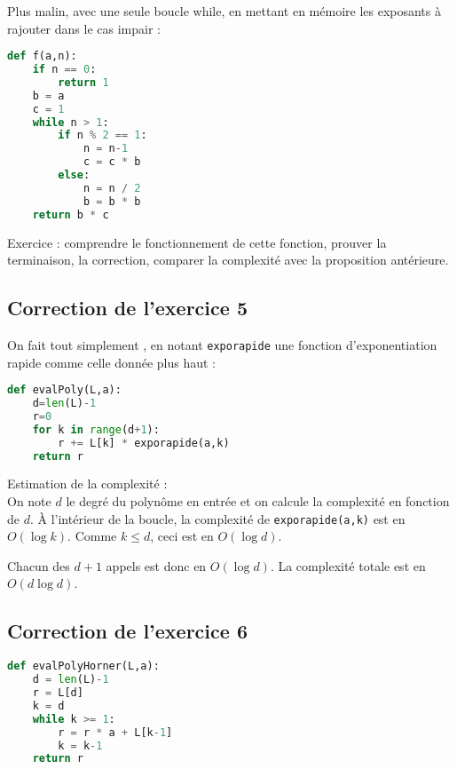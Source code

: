 \documentclass[11pt,a4paper]{article}
\begin{document}
Plus malin, avec une seule boucle while, en mettant en mémoire les exposants à rajouter dans le cas impair : 
\begin{lstlisting}[language=Python]
def f(a,n):
	if n == 0:
		return 1
	b = a
	c = 1
	while n > 1:
		if n % 2 == 1:
			n = n-1
			c = c * b
		else:
			n = n / 2
			b = b * b
	return b * c
\end{lstlisting}

Exercice : comprendre le fonctionnement de cette fonction, prouver la terminaison, la correction, comparer la complexité avec la proposition antérieure.



\subsection*{Correction de l'exercice 5}

On fait tout simplement , en notant \verb+exporapide+ une fonction d'exponentiation rapide comme celle donnée plus haut : 

\begin{lstlisting}[language=Python]
def evalPoly(L,a):
	d=len(L)-1
	r=0
	for k in range(d+1):
		r += L[k] * exporapide(a,k)
	return r
\end{lstlisting}

Estimation de la complexité :\\
On note $d$ le degré du polynôme en entrée et on calcule la complexité en fonction de $d$.
À l'intérieur de la boucle, la complexité de \verb+exporapide(a,k)+ est en $O(\log k)$. Comme $k\leq d$, ceci est en $O(\log d)$.

Chacun des $d+1$ appels est donc en $O(\log d)$. 
La complexité totale est en $O(d\log d)$.

\subsection*{Correction de l'exercice 6}

\begin{lstlisting}[language=Python]
def evalPolyHorner(L,a):
	d = len(L)-1
	r = L[d]
	k = d
	while k >= 1:
		r = r * a + L[k-1]
		k = k-1
	return r
\end{lstlisting}
\end{document}
